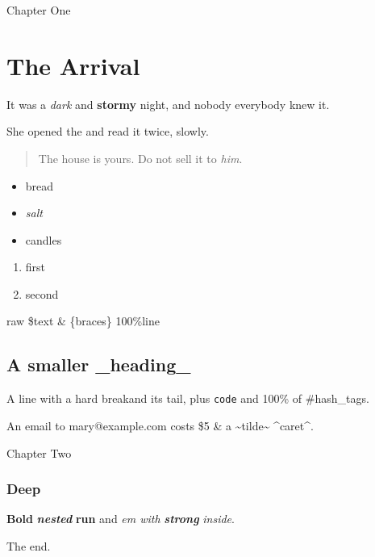 \providecommand{\st}[1]{#1}
\providecommand{\hypertarget}[2]{#2}
\providecommand{\MaughamCrossLink}[2]{\ifdefined\hyperlink\hyperlink{#1}{#2}\else#2\fi}
\begin{prose}{Chapter One}
\hypertarget{p-en-a1b2}{}
\section*{The Arrival}
\hypertarget{p-en-c3d4}{}
It was a \emph{dark} and \textbf{stormy} night, and \st{nobody} everybody knew it.

\hypertarget{p-en-e5f6}{}
She opened the  and read it twice, slowly.

\hypertarget{p-en-g7h8}{}
\begin{quote}
The house is yours. Do not sell it to \emph{him}.

\end{quote}
\hypertarget{p-en-j9k0}{}
\begin{itemize}
\item bread
\item \emph{salt}
\item candles
\end{itemize}
\hypertarget{p-en-m1n2}{}
\scenebreak
\hypertarget{p-en-p3q4}{}
\begin{enumerate}
\item first
\item second
\end{enumerate}
\hypertarget{p-en-r5s6}{}
raw \$text \& \{braces\} 100\%\newline [bracketed] line

\hypertarget{p-en-t7v8}{}
\subsection*{A smaller \_heading\_}
\hypertarget{p-en-w9x0}{}
A line with a hard break\newline and its tail, plus \texttt{code} and 100\% of \#hash\_tags.

\hypertarget{p-en-y1z2}{}
An email to mary@example.com costs \$5 \& a \textasciitilde{}tilde\textasciitilde{} \textasciicircum{}caret\textasciicircum{}.

\end{prose}
\clearpage
\begin{prose}{Chapter Two}
\subsubsection*{Deep}
\textbf{Bold }\textbf{\emph{nested}}\textbf{ run} and \emph{em with }\textbf{\emph{strong}}\emph{ inside}.

The end.

\end{prose}
